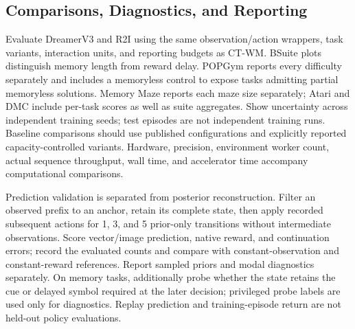 \documentclass{article}
\begin{document}
\subsection{Comparisons, Diagnostics, and Reporting}

Evaluate DreamerV3 and R2I using the same observation/action wrappers, task variants, interaction units, and reporting budgets as CT-WM. BSuite plots distinguish memory length from reward delay. POPGym reports every difficulty separately and includes a memoryless control to expose tasks admitting partial memoryless solutions. Memory Maze reports each maze size separately; Atari and DMC include per-task scores as well as suite aggregates. Show uncertainty across independent training seeds; test episodes are not independent training runs. Baseline comparisons should use published configurations and explicitly reported capacity-controlled variants. Hardware, precision, environment worker count, actual sequence throughput, wall time, and accelerator time accompany computational comparisons.

Prediction validation is separated from posterior reconstruction. Filter an observed prefix to an anchor, retain its complete state, then apply recorded subsequent actions for 1, 3, and 5 prior-only transitions without intermediate observations. Score vector/image prediction, native reward, and continuation errors; record the evaluated counts and compare with constant-observation and constant-reward references. Report sampled priors and modal diagnostics separately. On memory tasks, additionally probe whether the state retains the cue or delayed symbol required at the later decision; privileged probe labels are used only for diagnostics. Replay prediction and training-episode return are not held-out policy evaluations.
\end{document}
